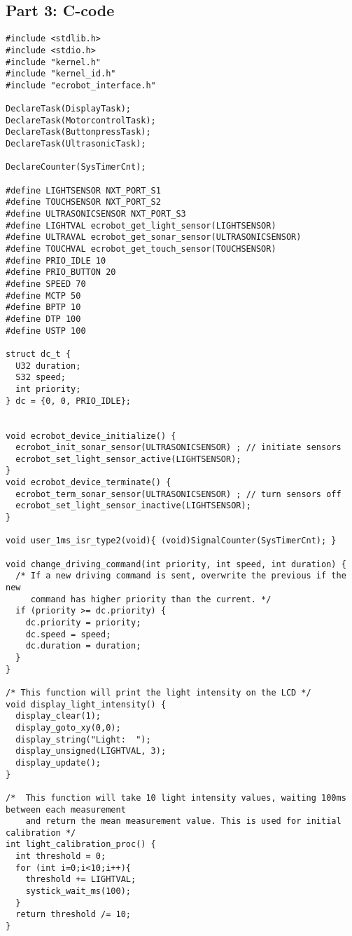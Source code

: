 \documentclass[a4paper,10pt]{report}
\begin{document}
\subsection*{Part 3: C-code}
\begin{lstlisting}[label=some-code,caption=part3.c,mathescape]
#include <stdlib.h>
#include <stdio.h>
#include "kernel.h"
#include "kernel_id.h"
#include "ecrobot_interface.h"

DeclareTask(DisplayTask);
DeclareTask(MotorcontrolTask);
DeclareTask(ButtonpressTask);
DeclareTask(UltrasonicTask);

DeclareCounter(SysTimerCnt);

#define LIGHTSENSOR NXT_PORT_S1
#define TOUCHSENSOR NXT_PORT_S2
#define ULTRASONICSENSOR NXT_PORT_S3
#define LIGHTVAL ecrobot_get_light_sensor(LIGHTSENSOR)
#define ULTRAVAL ecrobot_get_sonar_sensor(ULTRASONICSENSOR)
#define TOUCHVAL ecrobot_get_touch_sensor(TOUCHSENSOR)
#define PRIO_IDLE 10
#define PRIO_BUTTON 20
#define SPEED 70
#define MCTP 50
#define BPTP 10
#define DTP 100
#define USTP 100

struct dc_t {
  U32 duration;
  S32 speed;
  int priority;
} dc = {0, 0, PRIO_IDLE};


void ecrobot_device_initialize() {
  ecrobot_init_sonar_sensor(ULTRASONICSENSOR) ; // initiate sensors
  ecrobot_set_light_sensor_active(LIGHTSENSOR);
}
void ecrobot_device_terminate() {
  ecrobot_term_sonar_sensor(ULTRASONICSENSOR) ; // turn sensors off
  ecrobot_set_light_sensor_inactive(LIGHTSENSOR);
}

void user_1ms_isr_type2(void){ (void)SignalCounter(SysTimerCnt); } 

void change_driving_command(int priority, int speed, int duration) {
  /* If a new driving command is sent, overwrite the previous if the new
     command has higher priority than the current. */
  if (priority >= dc.priority) {
    dc.priority = priority;
    dc.speed = speed;
    dc.duration = duration;
  }
}

/* This function will print the light intensity on the LCD */
void display_light_intensity() {
  display_clear(1);
  display_goto_xy(0,0);
  display_string("Light:  ");
  display_unsigned(LIGHTVAL, 3);
  display_update();
}

/*  This function will take 10 light intensity values, waiting 100ms between each measurement
    and return the mean measurement value. This is used for initial calibration */
int light_calibration_proc() {
  int threshold = 0;
  for (int i=0;i<10;i++){
    threshold += LIGHTVAL;
    systick_wait_ms(100);
  }
  return threshold /= 10;
}


\end{lstlisting}
\end{document}
